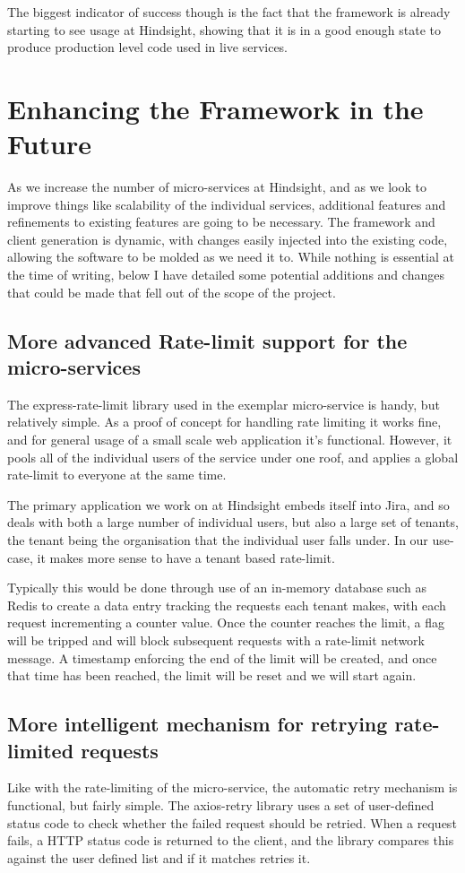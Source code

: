 The biggest indicator of success though is the fact that the framework is already starting to see usage at Hindsight, showing that it is in a good enough state to produce production level code used in live services.

\section{Enhancing the Framework in the Future}
As we increase the number of micro-services at Hindsight, and as we look to improve things like scalability of the individual services, additional features and refinements to existing features are going to be necessary. The framework and client generation is dynamic, with changes easily injected into the existing code, allowing the software to be molded as we need it to. While nothing is essential at the time of writing, below I have detailed some potential additions and changes that could be made that fell out of the scope of the project.
\subsection{More advanced Rate-limit support for the micro-services}
The express-rate-limit library used in the exemplar micro-service is handy, but relatively simple. As a proof of concept for handling rate limiting it works fine, and for general usage of a small scale web application it's functional. However, it pools all of the individual users of the service under one roof, and applies a global rate-limit to everyone at the same time.

The primary application we work on at Hindsight embeds itself into Jira, and so deals with both a large number of individual users, but also a large set of tenants, the tenant being the organisation that the individual user falls under. In our use-case, it makes more sense to have a tenant based rate-limit.

Typically this would be done through use of an in-memory database such as Redis to create a data entry tracking the requests each tenant makes, with each request incrementing a counter value. Once the counter reaches the limit, a flag will be tripped and will block subsequent requests with a rate-limit network message. A timestamp enforcing the end of the limit will be created, and once that time has been reached, the limit will be reset and we will start again.
\subsection{More intelligent mechanism for retrying rate-limited requests}
Like with the rate-limiting of the micro-service, the automatic retry mechanism is functional, but fairly simple. The axios-retry library uses a set of user-defined status code to check whether the failed request should be retried. When a request fails, a HTTP status code is returned to the client, and the library compares this against the user defined list and if it matches retries it. 

